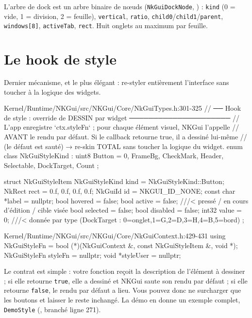 L'arbre de dock est un arbre binaire de nœuds
(\texttt{NkGuiDockNode}, ) : \texttt{kind} (0 =
vide, 1 = division, 2 = feuille), \texttt{vertical}, \texttt{ratio},
\texttt{child0}/\texttt{child1}/\texttt{parent}, \texttt{windows[8]},
\texttt{activeTab}, \texttt{rect}. Huit onglets au maximum par feuille.

\section{Le hook de style}

Dernier mécanisme, et le plus élégant : re-styler entièrement l'interface sans
toucher à la logique des widgets.

\begin{nkcode}{Kernel/Runtime/NKGui/src/NKGui/Core/NkGuiTypes.h:301-325}
// ── Hook de style : override de DESSIN par widget ─────────────────────
// L'app enregistre `ctx.styleFn` ; pour chaque élément visuel, NKGui l'appelle
// AVANT le rendu par défaut. Si le callback retourne true, il a dessiné lui-même
// (le défaut est sauté) → re-skin TOTAL sans toucher la logique du widget.
enum class NkGuiStyleKind : uint8 {
    Button = 0, FrameBg, CheckMark, Header, Selectable, DockTarget, Count
};

struct NkGuiStyleItem {
        NkGuiStyleKind kind = NkGuiStyleKind::Button;
        NkRect rect = {0.f, 0.f, 0.f, 0.f};
        NkGuiId id = NKGUI_ID_NONE;
        const char *label = nullptr;
        bool hovered = false;
        bool active = false;   ///< pressé / en cours d'édition / cible visée
        bool selected = false;
        bool disabled = false;
        int32 value = 0;       ///< donnée par type (DockTarget : 0=onglet,1=G,2=D,3=H,4=B,5=bord)
};
\end{nkcode}

\begin{nkcode}{Kernel/Runtime/NKGui/src/NKGui/Core/NkGuiContext.h:429-431}
using NkGuiStyleFn = bool (*)(NkGuiContext &, const NkGuiStyleItem &, void *);
NkGuiStyleFn styleFn = nullptr;
void *styleUser = nullptr;
\end{nkcode}

Le contrat est simple : votre fonction reçoit la description de l'élément à
dessiner ; si elle retourne \texttt{true}, elle a dessiné et NKGui saute son
rendu par défaut ; si elle retourne \texttt{false}, le rendu par défaut a lieu.
Vous pouvez donc ne surcharger que les boutons et laisser le reste inchangé. La
démo en donne un exemple complet, \texttt{DemoStyle}
(, branché ligne
271).

